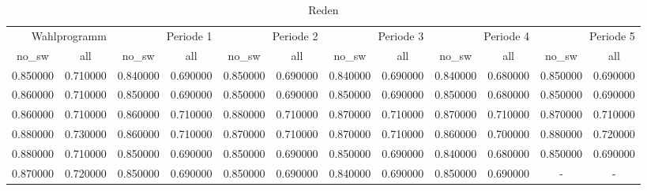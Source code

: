 \begin{table}
\caption{Reden}
\label{tab:meine_tabelle}
\begin{tabular}{cc||cc||cc||cc||cc||cc}
\toprule
\multicolumn{2}{r}{Wahlprogramm} & \multicolumn{2}{r}{Periode 1} & \multicolumn{2}{r}{Periode 2} & \multicolumn{2}{r}{Periode 3} & \multicolumn{2}{r}{Periode 4} & \multicolumn{2}{r}{Periode 5} \\
no_sw & all & no_sw & all & no_sw & all & no_sw & all & no_sw & all & no_sw & all \\
\midrule
0.850000 & 0.710000 & 0.840000 & 0.690000 & 0.850000 & 0.690000 & 0.840000 & 0.690000 & 0.840000 & 0.680000 & 0.850000 & 0.690000 \\
0.860000 & 0.710000 & 0.850000 & 0.690000 & 0.850000 & 0.690000 & 0.850000 & 0.690000 & 0.850000 & 0.680000 & 0.850000 & 0.690000 \\
0.860000 & 0.710000 & 0.860000 & 0.710000 & 0.880000 & 0.710000 & 0.870000 & 0.710000 & 0.870000 & 0.710000 & 0.870000 & 0.710000 \\
0.880000 & 0.730000 & 0.860000 & 0.710000 & 0.870000 & 0.710000 & 0.870000 & 0.710000 & 0.860000 & 0.700000 & 0.880000 & 0.720000 \\
0.880000 & 0.710000 & 0.850000 & 0.690000 & 0.850000 & 0.690000 & 0.850000 & 0.690000 & 0.840000 & 0.680000 & 0.850000 & 0.690000 \\
0.870000 & 0.720000 & 0.850000 & 0.690000 & 0.850000 & 0.690000 & 0.840000 & 0.690000 & 0.850000 & 0.690000 & - & - \\
\bottomrule
\end{tabular}
\end{table}
